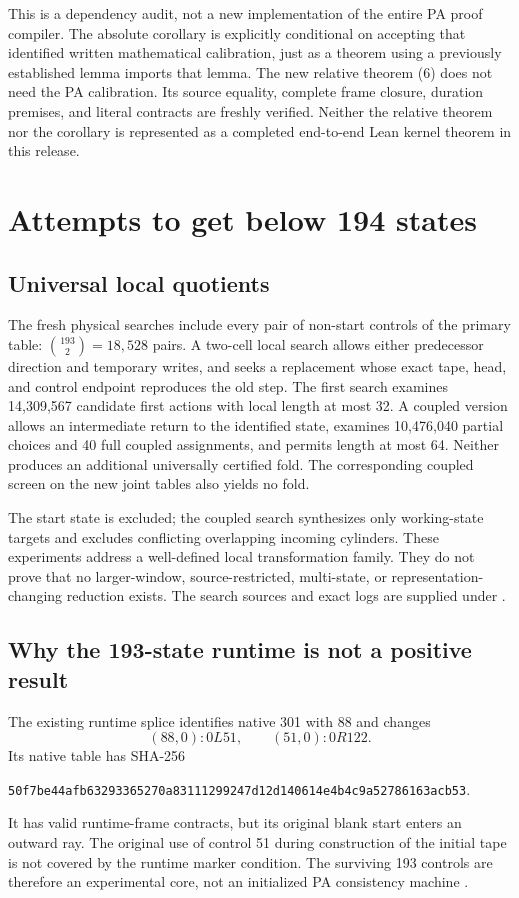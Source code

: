 \documentclass[11pt,a4paper]{article}
\newcommand{\hash}[1]{\nolinkurl{#1}}
\begin{document}
This is a dependency audit, not a new implementation of the entire PA proof
compiler. The absolute corollary is explicitly conditional on accepting
that identified written mathematical calibration, just as a theorem
using a previously established lemma imports that lemma. The new relative
theorem (6) does not need the PA calibration. Its source equality, complete
frame closure, duration premises, and literal contracts are freshly
verified. Neither the relative theorem nor the corollary is represented
as a completed end-to-end Lean kernel theorem in this release.

\section{Attempts to get below 194 states}
\label{sec:search}

\subsection{Universal local quotients}
The fresh physical searches include every pair of non-start controls of
the primary table: $\binom{193}{2}=18{,}528$ pairs. A two-cell local search
allows either predecessor direction and temporary writes, and seeks a
replacement whose exact tape, head, and control endpoint reproduces the
old step. The first search examines 14,309,567 candidate first actions
with local length at most 32. A coupled version allows an intermediate
return to the identified state, examines 10,476,040 partial choices and
40 full coupled assignments, and permits length at most 64. Neither
produces an additional universally certified fold. The corresponding
coupled screen on the new joint tables also yields no fold.

The start state is excluded; the coupled search synthesizes only working-state targets and excludes conflicting overlapping incoming cylinders. These experiments address a well-defined local transformation family.
They do not prove that no larger-window, source-restricted, multi-state,
or representation-changing reduction exists. The search sources and exact
logs are supplied under .

\subsection{Why the 193-state runtime is not a positive result}
The existing runtime splice identifies native 301 with 88 and changes
\[
(88,0):0L51,\qquad(51,0):0R122.
\]
Its native table has SHA-256
\begin{center}\small
\hash{50f7be44afb63293365270a83111299247d12d140614e4b4c9a52786163acb53}.
\end{center}
It has valid runtime-frame contracts, but its original blank start enters
an outward ray. The original use of control 51 during construction of the
initial tape is not covered by the runtime marker condition. The surviving
193 controls are therefore an experimental core, not an initialized PA
consistency machine \cite{runtime193}.
\end{document}
